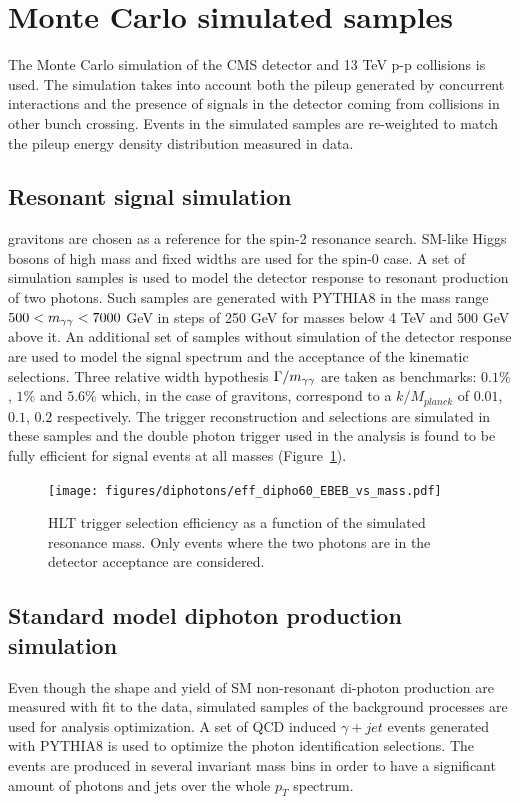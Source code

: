 \section{Monte Carlo simulated samples}
The Monte Carlo simulation of the CMS detector and 13 TeV p-p collisions is used. The simulation
takes into account both the pileup generated by concurrent interactions and the presence of
signals in the detector coming from collisions in other bunch crossing. Events in the simulated samples
are re-weighted to match the pileup energy density distribution measured in data.

\subsection{Resonant signal simulation}
\RS gravitons are chosen as a reference for the spin-2 resonance search. SM-like Higgs bosons of high mass and
fixed widths are used for the spin-0 case.
A set of simulation samples is used to model the detector response to resonant production of two photons.
Such samples are generated with PYTHIA8 in the mass range $500 < m_{\gamma\gamma} < 7000$ GeV in steps of 250 GeV for
masses below 4 TeV and 500 GeV above it. An additional set of samples without simulation of the detector
response are used to model the signal spectrum and the acceptance of the kinematic selections.
Three relative width hypothesis $\Gamma/m_{\gamma\gamma}$ are taken as benchmarks: $0.1\%$, $1\%$ and $5.6\%$ which,
in the case of \RS gravitons, correspond to a $k/M_{planck}$ of $0.01$, $0.1$, $0.2$ respectively.
The trigger reconstruction and selections are simulated in these samples and the double photon trigger
used in the analysis is found to be fully efficient for signal events at all masses (Figure~\ref{fig:trig_eff_sig}).

\begin{figure}[h!]
  \centering
  \texttt{[image: figures/diphotons/eff\_dipho60\_EBEB\_vs\_mass.pdf]}
  \caption{HLT trigger selection efficiency as a function of the simulated resonance mass. Only events where the two photons are
  in the detector acceptance are considered.}
  \label{fig:trig_eff_sig}
\end{figure}

\subsection{Standard model diphoton production simulation}
Even though the shape and yield of SM non-resonant di-photon production are measured with fit to the data,
simulated samples of the background processes are used for analysis optimization. A set of QCD induced
$\gamma+jet$ events generated with PYTHIA8 is used to optimize the photon identification selections.
The events are produced in several invariant mass bins in order to have a significant amount of photons and
jets over the whole $p_T$ spectrum.

